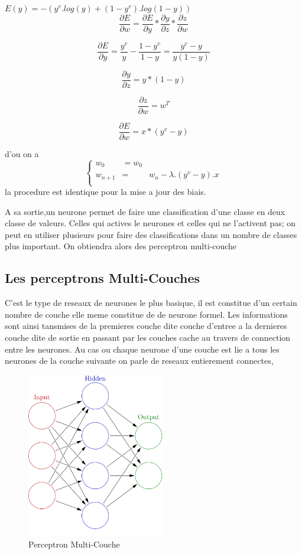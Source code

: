 \documentclass[twoside,twocolumn]{article}
\begin{document}
$E(y) = -(y^v.log(y) + (1-y^v).log(1-y))$
\[ \frac{\partial E}{\partial w}
   = \frac{\partial E}{\partial y}
   *\frac{\partial y}{\partial z}
      *\frac{\partial z}{\partial w}\]

\[ \frac{\partial E}{\partial y}
  =  \frac{y^v}{y} - \frac{1-y^v}{1-y}
  = \frac{y^v - y}{y(1 - y)} \]

\[ \frac{\partial y}{\partial z}
  =  y*(1-y) \]

\[ \frac{\partial z}{\partial w}
  =  w^T \]

\[ \frac{\partial E}{\partial w}
  = x*(y^v-y) \]

d'ou on a 
\[\left\{
  \begin{array}{rcr}
    w_{0} & =  w_0 \\
    w_{n+1} & = & w_{n} - \lambda.(y^v-y).x\\
  \end{array}
\right.\]
la procedure est identique pour la mise a jour des biais.

A sa sortie,un neurone permet de faire une classification d'une classe en deux classe de valeurs. 
Celles qui actives le neurones et celles qui ne l'activent pas; on peut en utiliser plusieurs pour 
faire des classifications dans un nombre de classes plus important. On obtiendra alors des perceptron
multi-couche

\subsection{Les perceptrons Multi-Couches}
C'est le type de reseaux de neurones le plus basique, il est constitue d'un certain nombre de couche elle meme constitue de de neurone formel\cite{warren1}. 
Les informations sont ainsi tansmises de la premieres couche dite couche d'entree a la dernieres couche dite de sortie en passant par les couches cache au travers
de connection entre les neurones. Au cas ou chaque neurone d'une couche est lie a tous les neurones de la couche suivante on parle de reseaux entierement connectes,

\begin{figure}[h]
  \centering
  \includegraphics[width=60mm]{Colored_neural_network.png}
  \caption{Perceptron Multi-Couche}
  \label{PerceptronMulticouche}
  \end{figure}
\end{document}
